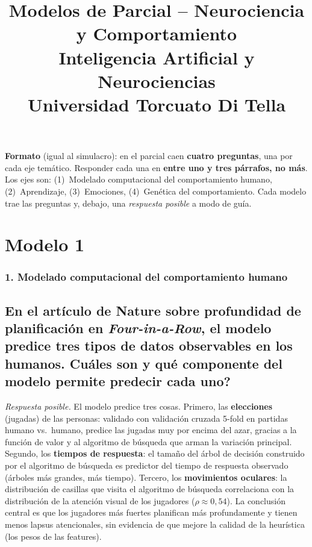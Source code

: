 \documentclass[11pt, a4paper]{article}
\title{\textbf{Modelos de Parcial -- Neurociencia y Comportamiento} \\
\large Inteligencia Artificial y Neurociencias \\ Universidad Torcuato Di Tella}
\author{}
\date{}
\newcommand{\pregunta}[1]{\subsection{#1}}
\newcommand{\eje}[1]{\subsubsection{#1}}
\begin{document}
\maketitle

\begin{mdframed}[linecolor=black, linewidth=0.7pt]
\textbf{Formato} (igual al simulacro): en el parcial caen \textbf{cuatro preguntas}, una por cada eje tem\'atico. Responder cada una en \textbf{entre uno y tres p\'arrafos, no m\'as}. Los ejes son: (1)~Modelado computacional del comportamiento humano, (2)~Aprendizaje, (3)~Emociones, (4)~Gen\'etica del comportamiento. Cada modelo trae las preguntas y, debajo, una \emph{respuesta posible} a modo de gu\'ia.
\end{mdframed}

\section{Modelo 1}

\eje{1. Modelado computacional del comportamiento humano}
\pregunta{En el art\'iculo de Nature sobre profundidad de planificaci\'on en \textit{Four-in-a-Row}, el modelo predice tres tipos de datos observables en los humanos. \textquestiondown Cu\'ales son y qu\'e componente del modelo permite predecir cada uno?}

\begin{respuesta}
\textit{Respuesta posible.} El modelo predice tres cosas. Primero, las \textbf{elecciones} (jugadas) de las personas: validado con validaci\'on cruzada 5-fold en partidas humano vs.\ humano, predice las jugadas muy por encima del azar, gracias a la funci\'on de valor y al algoritmo de b\'usqueda que arman la variaci\'on principal. Segundo, los \textbf{tiempos de respuesta}: el tama\~no del \'arbol de decisi\'on construido por el algoritmo de b\'usqueda es predictor del tiempo de respuesta observado (\'arboles m\'as grandes, m\'as tiempo). Tercero, los \textbf{movimientos oculares}: la distribuci\'on de casillas que visita el algoritmo de b\'usqueda correlaciona con la distribuci\'on de la atenci\'on visual de los jugadores ($\rho \approx 0{,}54$). La conclusi\'on central es que los jugadores m\'as fuertes planifican m\'as profundamente y tienen menos lapsus atencionales, sin evidencia de que mejore la calidad de la heur\'istica (los pesos de las features).
\end{respuesta}
\end{document}
